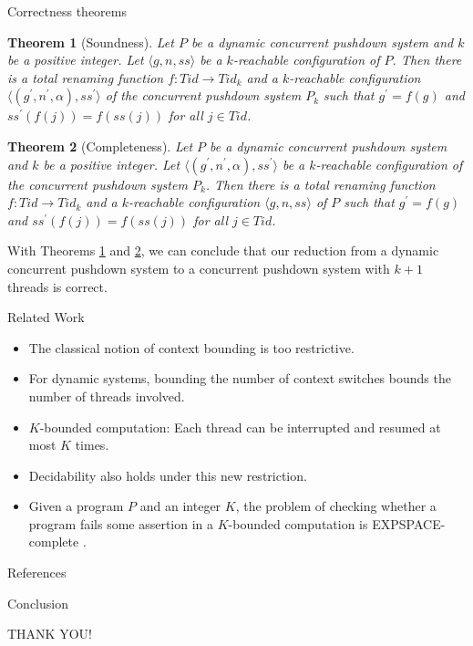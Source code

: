 \documentclass[10pt,notheorems]{beamer}
\theoremstyle{plain} %
\newtheorem{theorem}{Theorem}
\begin{document}
\begin{frame}{Correctness theorems}
    \begin{theorem}[Soundness]\label{thm5}
       Let $P$ be a dynamic concurrent pushdown system and $k$ be a positive integer. 
       Let $\langle g,n,ss\rangle$ be a $k$-reachable configuration of $P$. Then there is a total 
       renaming function $f: Tid\rightarrow Tid_k$ and a $k$-reachable configuration $\langle(g^{\prime},n^{\prime},\alpha),ss^{\prime}\rangle$
       of the concurrent pushdown system $P_k$ such that $g^{\prime}=f(g)$ and $ss^{\prime}(f(j))=f(ss(j))$ for all $j\in Tid$.
    \end{theorem}
    \begin{theorem}[Completeness]\label{thm6}
        Let $P$ be a dynamic concurrent pushdown system and $k$ be a positive integer. 
        Let $\langle(g^{\prime},n^{\prime},\alpha),ss^{\prime}\rangle$ be a $k$-reachable configuration of the concurrent 
        pushdown system $P_k$. Then there is a total renaming function $f:Tid\rightarrow Tid_k$ and a 
        $k$-reachable configuration $\langle g,n,ss\rangle$ of $P$ such that $g^{\prime}=f(g)$ and $ss^{\prime}(f(j))=f(ss(j))$ for all $j\in Tid$.
    \end{theorem}
 With Theorems \ref{thm5} and \ref{thm6}, we can conclude that our reduction from a dynamic 
 concurrent pushdown system to a concurrent pushdown system with $k+1$ threads is correct. 
\end{frame}
\begin{frame}{Related Work}
    \begin{itemize}
        \item The classical notion of context bounding is too restrictive.
        \item For dynamic systems, bounding the number of context switches bounds the number of 
        threads involved.
        \item $K$-bounded computation: Each thread can be interrupted and resumed at most $K$ times. 
        \item Decidability also holds under this new restriction.
        \item Given a program $P$ and an integer $K$, the problem of checking whether a program fails
        some assertion in a $K$-bounded computation is EXPSPACE-complete \cite{atig2011context}.
    \end{itemize}
\end{frame}
\begin{frame}[allowframebreaks]{References}
    {}
    
\end{frame}
\begin{frame}{Conclusion}
    \begin{center}
        THANK YOU!
    \end{center}
\end{frame}
\end{document}
